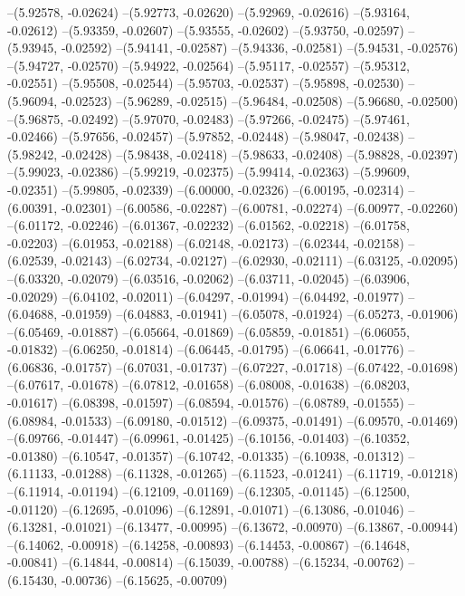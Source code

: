 --(5.92578, -0.02624)
--(5.92773, -0.02620)
--(5.92969, -0.02616)
--(5.93164, -0.02612)
--(5.93359, -0.02607)
--(5.93555, -0.02602)
--(5.93750, -0.02597)
--(5.93945, -0.02592)
--(5.94141, -0.02587)
--(5.94336, -0.02581)
--(5.94531, -0.02576)
--(5.94727, -0.02570)
--(5.94922, -0.02564)
--(5.95117, -0.02557)
--(5.95312, -0.02551)
--(5.95508, -0.02544)
--(5.95703, -0.02537)
--(5.95898, -0.02530)
--(5.96094, -0.02523)
--(5.96289, -0.02515)
--(5.96484, -0.02508)
--(5.96680, -0.02500)
--(5.96875, -0.02492)
--(5.97070, -0.02483)
--(5.97266, -0.02475)
--(5.97461, -0.02466)
--(5.97656, -0.02457)
--(5.97852, -0.02448)
--(5.98047, -0.02438)
--(5.98242, -0.02428)
--(5.98438, -0.02418)
--(5.98633, -0.02408)
--(5.98828, -0.02397)
--(5.99023, -0.02386)
--(5.99219, -0.02375)
--(5.99414, -0.02363)
--(5.99609, -0.02351)
--(5.99805, -0.02339)
--(6.00000, -0.02326)
--(6.00195, -0.02314)
--(6.00391, -0.02301)
--(6.00586, -0.02287)
--(6.00781, -0.02274)
--(6.00977, -0.02260)
--(6.01172, -0.02246)
--(6.01367, -0.02232)
--(6.01562, -0.02218)
--(6.01758, -0.02203)
--(6.01953, -0.02188)
--(6.02148, -0.02173)
--(6.02344, -0.02158)
--(6.02539, -0.02143)
--(6.02734, -0.02127)
--(6.02930, -0.02111)
--(6.03125, -0.02095)
--(6.03320, -0.02079)
--(6.03516, -0.02062)
--(6.03711, -0.02045)
--(6.03906, -0.02029)
--(6.04102, -0.02011)
--(6.04297, -0.01994)
--(6.04492, -0.01977)
--(6.04688, -0.01959)
--(6.04883, -0.01941)
--(6.05078, -0.01924)
--(6.05273, -0.01906)
--(6.05469, -0.01887)
--(6.05664, -0.01869)
--(6.05859, -0.01851)
--(6.06055, -0.01832)
--(6.06250, -0.01814)
--(6.06445, -0.01795)
--(6.06641, -0.01776)
--(6.06836, -0.01757)
--(6.07031, -0.01737)
--(6.07227, -0.01718)
--(6.07422, -0.01698)
--(6.07617, -0.01678)
--(6.07812, -0.01658)
--(6.08008, -0.01638)
--(6.08203, -0.01617)
--(6.08398, -0.01597)
--(6.08594, -0.01576)
--(6.08789, -0.01555)
--(6.08984, -0.01533)
--(6.09180, -0.01512)
--(6.09375, -0.01491)
--(6.09570, -0.01469)
--(6.09766, -0.01447)
--(6.09961, -0.01425)
--(6.10156, -0.01403)
--(6.10352, -0.01380)
--(6.10547, -0.01357)
--(6.10742, -0.01335)
--(6.10938, -0.01312)
--(6.11133, -0.01288)
--(6.11328, -0.01265)
--(6.11523, -0.01241)
--(6.11719, -0.01218)
--(6.11914, -0.01194)
--(6.12109, -0.01169)
--(6.12305, -0.01145)
--(6.12500, -0.01120)
--(6.12695, -0.01096)
--(6.12891, -0.01071)
--(6.13086, -0.01046)
--(6.13281, -0.01021)
--(6.13477, -0.00995)
--(6.13672, -0.00970)
--(6.13867, -0.00944)
--(6.14062, -0.00918)
--(6.14258, -0.00893)
--(6.14453, -0.00867)
--(6.14648, -0.00841)
--(6.14844, -0.00814)
--(6.15039, -0.00788)
--(6.15234, -0.00762)
--(6.15430, -0.00736)
--(6.15625, -0.00709)
